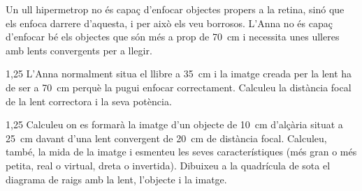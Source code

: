 Un ull hipermetrop no és capaç d'enfocar objectes propers a la retina, sinó que els enfoca darrere d'aquesta, i per això els veu borrosos. L'Anna no és capaç d'enfocar bé els objectes que són més a prop de 70~cm i necessita unes ulleres amb lents convergents per a llegir.

\begin{apartat}{1,25}
L'Anna normalment situa el llibre a 35~cm i la imatge creada per la lent ha de ser a 70~cm perquè la pugui enfocar correctament. Calculeu la distància focal de la lent correctora i la seva potència.
\end{apartat}

\begin{apartat}{1,25}
Calculeu on es formarà la imatge d'un objecte de 10~cm d'alçària situat a 25~cm davant d'una lent convergent de 20~cm de distància focal. Calculeu, també, la mida de la imatge i esmenteu les seves característiques (més gran o més petita, real o virtual, dreta o invertida). Dibuixeu a la quadrícula de sota el diagrama de raigs amb la lent, l'objecte i la imatge.
\end{apartat}


